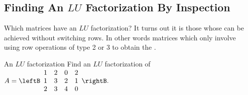 \subsection{Finding An $LU$ Factorization By Inspection}

Which matrices have an $LU$ factorization? It turns out it is those whose
{\ef} can be achieved without switching rows. In other words matrices which
only involve using row operations of type 2 or 3 to obtain the {\ef}.

\begin{example}{An $LU$ factorization}{}
Find an $LU$ factorization of $A=\leftB
\begin{array}{cccc}
1 & 2 & 0 & 2 \\
1 & 3 & 2 & 1 \\
2 & 3 & 4 & 0%
\end{array}
\rightB .$
\end{example}

